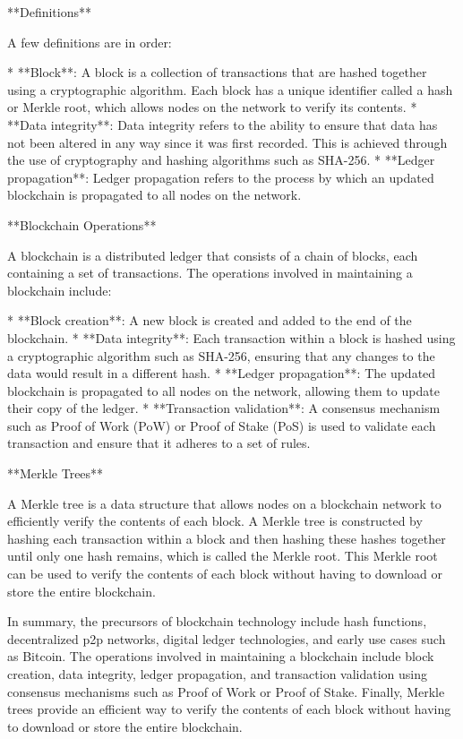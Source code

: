 \begin{documen}
**Definitions**

A few definitions are in order:

* **Block**: A block is a collection of transactions that are hashed together using a cryptographic algorithm. Each block has a unique identifier called a hash or Merkle root, which allows nodes on the network to verify its contents.
* **Data integrity**: Data integrity refers to the ability to ensure that data has not been altered in any way since it was first recorded. This is achieved through the use of cryptography and hashing algorithms such as SHA-256.
* **Ledger propagation**: Ledger propagation refers to the process by which an updated blockchain is propagated to all nodes on the network.

**Blockchain Operations**

A blockchain is a distributed ledger that consists of a chain of blocks, each containing a set of transactions. The operations involved in maintaining a blockchain include:

* **Block creation**: A new block is created and added to the end of the blockchain.
* **Data integrity**: Each transaction within a block is hashed using a cryptographic algorithm such as SHA-256, ensuring that any changes to the data would result in a different hash.
* **Ledger propagation**: The updated blockchain is propagated to all nodes on the network, allowing them to update their copy of the ledger.
* **Transaction validation**: A consensus mechanism such as Proof of Work (PoW) or Proof of Stake (PoS) is used to validate each transaction and ensure that it adheres to a set of rules.


**Merkle Trees**

A Merkle tree is a data structure that allows nodes on a blockchain network to efficiently verify the contents of each block. A Merkle tree is constructed by hashing each transaction within a block and then hashing these hashes together until only one hash remains, which is called the Merkle root. This Merkle root can be used to verify the contents of each block without having to download or store the entire blockchain.

In summary, the precursors of blockchain technology include hash functions, decentralized p2p networks, digital ledger technologies, and early use cases such as Bitcoin. The operations involved in maintaining a blockchain include block creation, data integrity, ledger propagation, and transaction validation using consensus mechanisms such as Proof of Work or Proof of Stake. Finally, Merkle trees provide an efficient way to verify the contents of each block without having to download or store the entire blockchain.


\end{documen}
